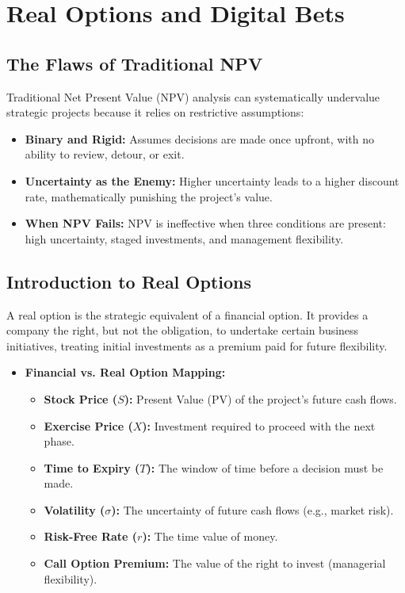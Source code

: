 \section{Real Options and Digital Bets}

\subsection{The Flaws of Traditional NPV}
Traditional Net Present Value (NPV) analysis can systematically undervalue
strategic projects because it relies on restrictive assumptions:
\begin{itemize}
    \item \textbf{Binary and Rigid:} Assumes decisions are made once upfront, with no ability to
          review, detour, or exit.
    \item \textbf{Uncertainty as the Enemy:} Higher uncertainty leads to a higher discount rate,
          mathematically punishing the project's value.
    \item \textbf{When NPV Fails:} NPV is ineffective when three conditions are present: high
          uncertainty, staged investments, and management flexibility.
\end{itemize}

\subsection{Introduction to Real Options}
A real option is the strategic equivalent of a financial option. It provides a
company the right, but not the obligation, to undertake certain business
initiatives, treating initial investments as a premium paid for future
flexibility.
\begin{itemize}
    \item \textbf{Financial vs. Real Option Mapping:}
          \begin{itemize}
              \item \textbf{Stock Price ($S$):} Present Value (PV) of the project's future cash flows.
              \item \textbf{Exercise Price ($X$):} Investment required to proceed with the next phase.
              \item \textbf{Time to Expiry ($T$):} The window of time before a decision must be made.
              \item \textbf{Volatility ($\sigma$):} The uncertainty of future cash flows (e.g., market
                    risk).
              \item \textbf{Risk-Free Rate ($r$):} The time value of money.
              \item \textbf{Call Option Premium:} The value of the right to invest (managerial
                    flexibility).
          \end{itemize}
\end{itemize}

